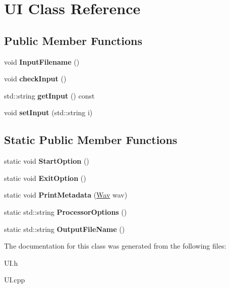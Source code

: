 \hypertarget{classUI}{}\section{UI Class Reference}
\label{classUI}
\subsection*{Public Member Functions}
\begin{DoxyCompactItemize}
\item 
\mbox{\label{classUI_a93dc13a2ec39cdd642dc9eb55e65b026}} 
void {\bfseries Input\+Filename} ()
\item 
\mbox{\label{classUI_abb6dad0e879bddf82d2bc9f0ddb246a1}} 
void {\bfseries check\+Input} ()
\item 
\mbox{\label{classUI_ab3612d3475161c5f7e32543793351d87}} 
std\+::string {\bfseries get\+Input} () const
\item 
\mbox{\label{classUI_afbf29686e5d8b517bfcfe6ed1ceccfc4}} 
void {\bfseries set\+Input} (std\+::string i)
\end{DoxyCompactItemize}
\subsection*{Static Public Member Functions}
\begin{DoxyCompactItemize}
\item 
\mbox{\label{classUI_ade684e1af6cdcc9ad9a9f4049294d5f7}} 
static void {\bfseries Start\+Option} ()
\item 
\mbox{\label{classUI_a8d1d1f3df8d204f641c085a4d3730c1b}} 
static void {\bfseries Exit\+Option} ()
\item 
\mbox{\label{classUI_a3a6f95af42279557e4467804c935d0e6}} 
static void {\bfseries Print\+Metadata} (\hyperlink{classWav}{Wav} wav)
\item 
\mbox{\label{classUI_a120c1f314d8feb754af4e63f477b4918}} 
static std\+::string {\bfseries Processor\+Options} ()
\item 
\mbox{\label{classUI_ad5a96cf0e114c4dac4a4d7958dd98c4a}} 
static std\+::string {\bfseries Output\+File\+Name} ()
\end{DoxyCompactItemize}


The documentation for this class was generated from the following files\+:\begin{DoxyCompactItemize}
\item 
U\+I.\+h\item 
U\+I.\+cpp\end{DoxyCompactItemize}
